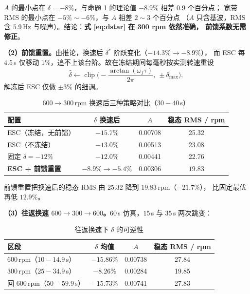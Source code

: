 \documentclass[UTF8,fontset=windows,a4paper,11pt]{ctexart}
\newcommand{\clip}{\operatorname{clip}}
\begin{document}
$A$ 的最小点在 $\delta=-8\%$，与命题 1 的理论值 $-8.9\%$ 相差 $0.9$ 个百分点；
宽带 RMS 的最小点在 $-5\%\sim-6\%$，与 $A$ 相差 $2\sim3$ 个百分点
（$A$ 只含基波，RMS 含 5.9\,Hz 与噪声）。结论：\textbf{式 \eqref{eq:dstar} 在 300 rpm 依然准确，
前馈系数无需修正}。

\textbf{（2）前馈重置。}由推论，换速后 $\delta^{*}$ 阶跃变化（$-14.3\%\to-8.9\%$），
而 ESC 每 $4.5$\,s 仅移动 $1\%$，追不上该台阶。故在冻结期间每毫秒按实测转速重设
\begin{equation}
\hat\delta \leftarrow \clip\!\Big(-\frac{\arctan(\omega_f\tau)}{2\pi},\ \pm\delta_{\max}\Big),
\label{eq:ff}
\end{equation}
解冻后 ESC 仅做 $\pm3\%$ 的细调。

\begin{table}[H]
\centering
\caption{$600\to300$\,rpm 换速后三种策略对比（$30\!-\!40$\,s）}
\begin{tabular}{@{}lccc@{}}
\toprule
配置 & $\delta$ 换速后 & $A$ & 稳态 RMS / rpm \\
\midrule
ESC（冻结，无前馈） & $-15.7\%$ & 0.00708 & 25.32 \\
ESC（不冻结） & $-13.0\%$ & 0.00513 & 23.08 \\
固定 $\delta=-12\%$ & $-12.0\%$ & 0.00441 & 22.76 \\
\textbf{ESC + 前馈重置} & $-8.9\%\to-5.4\%$ & $\mathbf{0.00306}$ & $\mathbf{19.83}$ \\
\bottomrule
\end{tabular}
\end{table}

前馈重置把换速后的稳态 RMS 由 $25.32$ 降到 $19.83$\,rpm（$-21.7\%$），
比固定最优再低 $12.9\%$。

\textbf{（3）往返换速 $600\to300\to600$。}$60$\,s 仿真，$15$\,s 与 $35$\,s 两次跳变：

\begin{table}[H]
\centering
\caption{往返换速下 $\delta$ 的可逆性}
\begin{tabular}{@{}lccc@{}}
\toprule
区段 & $\delta$ 均值 & $A$ & 稳态 RMS / rpm \\
\midrule
$600$\,rpm（$10\!-\!14.9$\,s） & $-15.86\%$ & 0.00738 & 27.84 \\
$300$\,rpm（$25\!-\!34.9$\,s） & $-8.26\%$ & 0.00284 & 19.85 \\
回 $600$\,rpm（$50\!-\!59.9$\,s） & $-15.73\%$ & 0.00741 & 27.83 \\
\bottomrule
\end{tabular}
\end{table}
\end{document}
